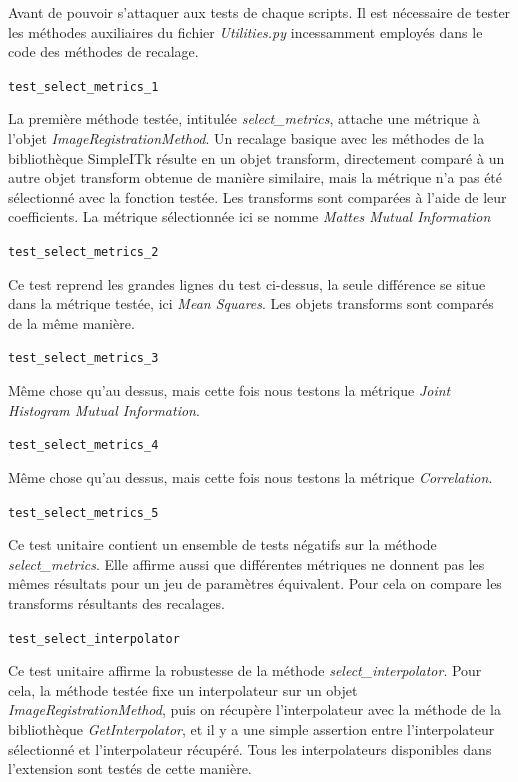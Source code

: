 \documentclass{article}
\newcommand{\method}[1]{\hspace{1in}\texttt{#1}\bigskip}
\begin{document}
{{{            Avant de pouvoir s'attaquer aux tests de chaque scripts. Il est nécessaire de tester les méthodes auxiliaires du fichier \textit{Utilities.py} incessamment employés dans le code des méthodes de recalage.

            \bigskip
            \method{test\_select\_metrics\_1}

            La première méthode testée, intitulée \textit{select\_metrics}, attache une métrique à l'objet \textit{ImageRegistrationMethod}. Un recalage basique avec les méthodes de la bibliothèque SimpleITk résulte en un objet transform, directement comparé à un autre objet transform obtenue de manière similaire, mais la métrique n'a pas été sélectionné avec la fonction testée. Les transforms sont comparées à l'aide de leur coefficients. La métrique sélectionnée ici se nomme \textit{Mattes Mutual Information}

            \bigskip
            \method{test\_select\_metrics\_2}

            Ce test reprend les grandes lignes du test ci-dessus, la seule différence se situe dans la métrique testée, ici \textit{Mean Squares}. Les objets transforms sont comparés de la même manière.

            \bigskip
            \method{test\_select\_metrics\_3}

            Même chose qu'au dessus, mais cette fois nous testons la métrique \textit{Joint Histogram Mutual Information}.

            \bigskip
            \method{test\_select\_metrics\_4}

            Même chose qu'au dessus, mais cette fois nous testons la métrique \textit{Correlation}.

            \bigskip
            \method{test\_select\_metrics\_5}

            Ce test unitaire contient un ensemble de tests négatifs sur la méthode \textit{select\_metrics}. Elle affirme aussi que différentes métriques ne donnent pas les mêmes résultats pour un jeu de paramètres équivalent. Pour cela on compare les transforms résultants des recalages.

            \bigskip
            \method{test\_select\_interpolator}

            Ce test unitaire affirme la robustesse de la méthode \textit{select\_interpolator}. Pour cela, la méthode testée fixe un interpolateur sur un objet \textit{ImageRegistrationMethod}, puis on récupère l'interpolateur avec la méthode de la bibliothèque \textit{GetInterpolator}, et il y a une simple assertion entre l'interpolateur sélectionné et l'interpolateur récupéré. Tous les interpolateurs disponibles dans l'extension sont testés de cette manière.

}}}
\end{document}
